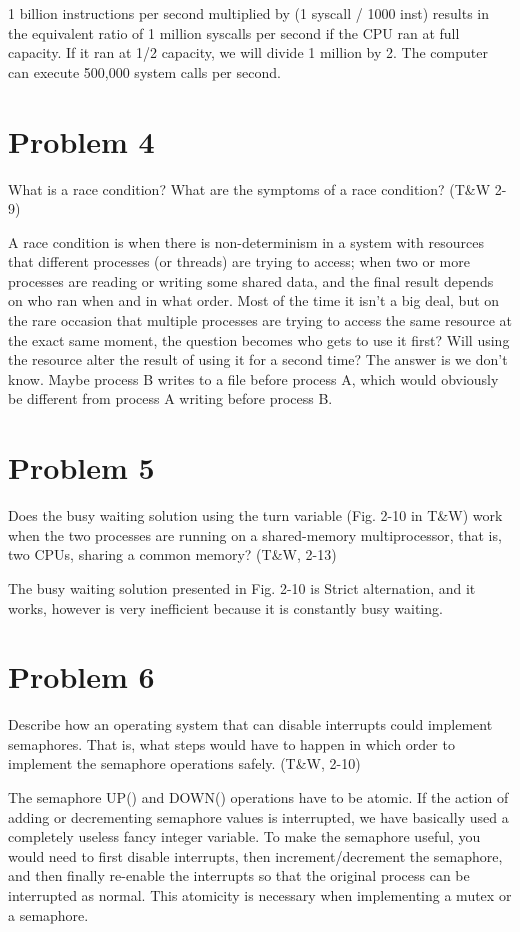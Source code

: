 \documentclass[11pt]{article}
\begin{document}
1 billion instructions per second multiplied by (1 syscall / 1000 inst) results in the equivalent ratio of 1 million syscalls per second if the CPU ran at full capacity. If it ran at 1/2 capacity, we will divide 1 million by 2. The computer can execute 500,000 system calls per second. 


\section*{Problem 4}
What is a race condition? What are the symptoms of a race condition? (T\&W 2-9)

A race condition is when there is non-determinism in a system with resources that different processes (or threads) are trying to access; when two or more processes are reading or writing some shared data, and the final result depends on who ran when and in what order. Most of the time it isn't a big deal, but on the rare occasion that multiple processes are trying to access the same resource at the exact same moment, the question becomes who gets to use it first? Will using the resource alter the result of using it for a second time? The answer is we don't know. Maybe process B writes to a file before process A, which would obviously be different from process A writing before process B.


\section*{Problem 5}
Does the busy waiting solution using the turn variable (Fig. 2-10 in T\&W) work when the two processes are running on a shared-memory multiprocessor, that is, two CPUs, sharing a common memory? (T\&W, 2-13)

The busy waiting solution presented in Fig. 2-10 is Strict alternation, and it works, however is very inefficient because it is constantly busy waiting. 


\section*{Problem 6}
Describe how an operating system that can disable interrupts could implement semaphores. That is, what steps would have to happen in which order to implement the semaphore operations safely. (T\&W, 2-10)

The semaphore UP() and DOWN() operations have to be atomic. If the action of adding or decrementing semaphore values is interrupted, we have basically used a completely useless fancy integer variable. To make the semaphore useful, you would need to first disable interrupts, then increment/decrement the semaphore, and then finally re-enable the interrupts so that the original process can be interrupted as normal. This atomicity is necessary when implementing a mutex or a semaphore.
\end{document}
